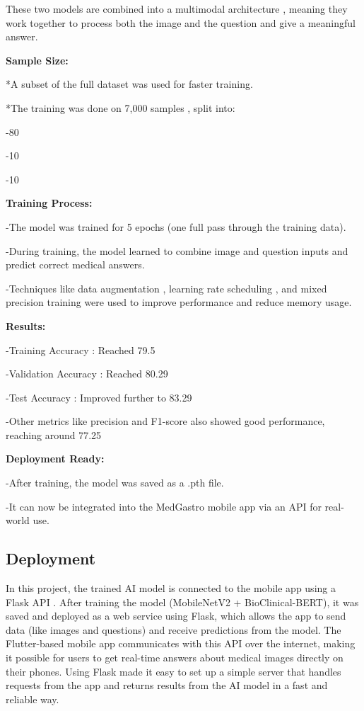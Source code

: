 \documentclass[12pt,a4paper]{report}
\begin{document}
These two models are combined into a multimodal architecture , meaning they work together to process both the image and the question and give a meaningful answer.

\textbf{Sample Size:}

*A subset of the full dataset was used for faster training.

*The training was done on 7,000 samples , split into:

-80%

-10%

-10%

\textbf{Training Process:}

-The model was trained for 5 epochs (one full pass through the training data).

-During training, the model learned to combine image and question inputs and predict correct medical answers.

-Techniques like data augmentation , learning rate scheduling , and mixed precision training were used to improve performance and reduce memory usage.

\textbf{Results:}

-Training Accuracy : Reached 79.5%

-Validation Accuracy : Reached 80.29%

-Test Accuracy : Improved further to 83.29%

-Other metrics like precision and F1-score also showed good performance, reaching around 77.25%

\textbf{Deployment Ready:}

-After training, the model was saved as a .pth file.

-It can now be integrated into the MedGastro mobile app via an API for real-world use.


\subsection{Deployment}
In this project, the trained AI model is connected to the mobile app using a Flask API . After training the model (MobileNetV2 + BioClinical-BERT), it was saved and deployed as a web service using Flask, which allows the app to send data (like images and questions) and receive predictions from the model. The Flutter-based mobile app communicates with this API over the internet, making it possible for users to get real-time answers about medical images directly on their phones. Using Flask made it easy to set up a simple server that handles requests from the app and returns results from the AI model in a fast and reliable way. 
\end{document}

